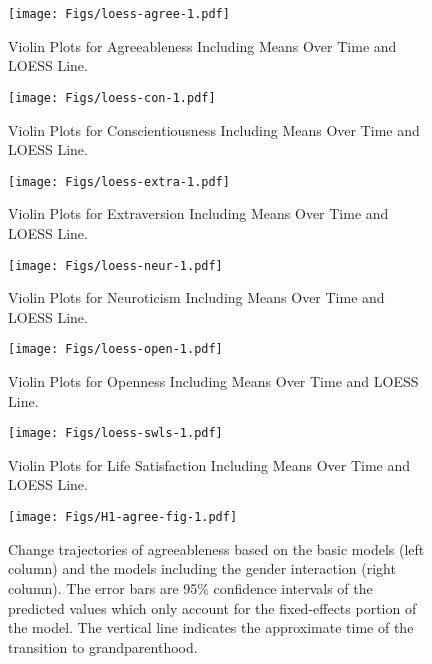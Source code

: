 \documentclass[
  english,
  man, noextraspace]{apa7}
\begin{document}
\begin{appendix}
\begin{figure}
\centering
\texttt{[image: Figs/loess-agree-1.pdf]}
\caption{\label{fig:loess-agree}Violin Plots for Agreeableness Including Means
Over Time and LOESS Line.}
\end{figure}




\begin{figure}
\centering
\texttt{[image: Figs/loess-con-1.pdf]}
\caption{\label{fig:loess-con}Violin Plots for Conscientiousness Including Means
Over Time and LOESS Line.}
\end{figure}




\begin{figure}
\centering
\texttt{[image: Figs/loess-extra-1.pdf]}
\caption{\label{fig:loess-extra}Violin Plots for Extraversion Including Means Over
Time and LOESS Line.}
\end{figure}




\begin{figure}
\centering
\texttt{[image: Figs/loess-neur-1.pdf]}
\caption{\label{fig:loess-neur}Violin Plots for Neuroticism Including Means Over
Time and LOESS Line.}
\end{figure}




\begin{figure}
\centering
\texttt{[image: Figs/loess-open-1.pdf]}
\caption{\label{fig:loess-open}Violin Plots for Openness Including Means Over Time
and LOESS Line.}
\end{figure}




\begin{figure}
\centering
\texttt{[image: Figs/loess-swls-1.pdf]}
\caption{\label{fig:loess-swls}Violin Plots for Life Satisfaction Including Means
Over Time and LOESS Line.}
\end{figure}








\begin{figure}
\centering
\texttt{[image: Figs/H1-agree-fig-1.pdf]}
\caption{\label{fig:H1-agree-fig}Change trajectories of agreeableness based on the
basic models (left column) and the models including the gender
interaction (right column). The error bars are 95\% confidence intervals
of the predicted values which only account for the fixed-effects portion
of the model. The vertical line indicates the approximate time of the
transition to grandparenthood.}
\end{figure}











\end{appendix}
\end{document}

